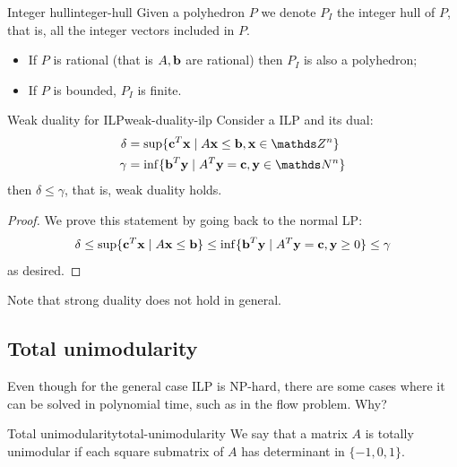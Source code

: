 \documentclass[12pt]{extarticle}
\renewcommand{\vec}[1]{\bvec{#1}}
\begin{document}
\begin{definition}{Integer hull}{integer-hull}
	Given a polyhedron $P$ we denote $P_I$ the integer hull of $P$, that is,
	all the integer vectors included in $P$.
\end{definition}

\begin{remark}{}{}
	\begin{itemize}
		\item If $P$ is rational (that is $A, \vec b$ are rational) then $P_I$ is also a polyhedron;
		\item If $P$ is bounded, $P_I$ is finite.
	\end{itemize}
\end{remark}

\begin{proposition}{Weak duality for ILP}{weak-duality-ilp}
	Consider a ILP and its dual:
	\begin{align}
		\delta & = \sup \{\vec c^T \vec x \mid A \vec x \leq \vec b, \vec x \in \Z^n \} \\
		\gamma & = \inf \{\vec b^T \vec y \mid A^T \vec y = \vec c, \vec y \in \N^n \}
	\end{align}
	then $\delta \leq \gamma$, that is, weak duality holds.
\end{proposition}

\begin{proof}
	We prove this statement by going back to the normal LP:
	\begin{equation}
		\delta \leq \sup \{ \vec c^T \vec x \mid A \vec x \leq \vec b \}
		\leq \inf \{ \vec b^T \vec y \mid A^T \vec y = \vec c, \vec y \geq 0\} \leq \gamma
	\end{equation}
	as desired.
\end{proof}

Note that strong duality does not hold in general.

\subsection{Total unimodularity}

Even though for the general case ILP is NP-hard, there are some cases where it can be solved in
polynomial time, such as in the flow problem.
Why?

\begin{definition}{Total unimodularity}{total-unimodularity}
	We say that a matrix $A$ is totally unimodular if each square submatrix of $A$ has determinant in
	$\{-1, 0, 1\}$.
\end{definition}
\end{document}
